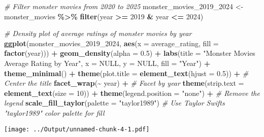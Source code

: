 \documentclass[
]{article}
\newenvironment{Shaded}{\begin{snugshade}}{\end{snugshade}}
\newcommand{\AttributeTok}[1]{\textcolor[rgb]{0.13,0.29,0.53}{#1}}
\newcommand{\CommentTok}[1]{\textcolor[rgb]{0.56,0.35,0.01}{\textit{#1}}}
\newcommand{\ConstantTok}[1]{\textcolor[rgb]{0.56,0.35,0.01}{#1}}
\newcommand{\DecValTok}[1]{\textcolor[rgb]{0.00,0.00,0.81}{#1}}
\newcommand{\FloatTok}[1]{\textcolor[rgb]{0.00,0.00,0.81}{#1}}
\newcommand{\FunctionTok}[1]{\textcolor[rgb]{0.13,0.29,0.53}{\textbf{#1}}}
\newcommand{\NormalTok}[1]{#1}
\newcommand{\OtherTok}[1]{\textcolor[rgb]{0.56,0.35,0.01}{#1}}
\newcommand{\SpecialCharTok}[1]{\textcolor[rgb]{0.81,0.36,0.00}{\textbf{#1}}}
\newcommand{\StringTok}[1]{\textcolor[rgb]{0.31,0.60,0.02}{#1}}
\begin{document}
\begin{Shaded}
\begin{Highlighting}[]
\CommentTok{\# Filter monster movies from 2020 to 2025}
\NormalTok{monster\_movies\_2019\_2024 }\OtherTok{\textless{}{-}}\NormalTok{ monster\_movies }\SpecialCharTok{\%\textgreater{}\%}
  \FunctionTok{filter}\NormalTok{(year }\SpecialCharTok{\textgreater{}=} \DecValTok{2019} \SpecialCharTok{\&}\NormalTok{ year }\SpecialCharTok{\textless{}=} \DecValTok{2024}\NormalTok{)}


\CommentTok{\# Density plot of average ratings of monster movies by year}
\FunctionTok{ggplot}\NormalTok{(monster\_movies\_2019\_2024, }\FunctionTok{aes}\NormalTok{(}\AttributeTok{x =}\NormalTok{ average\_rating, }\AttributeTok{fill =} \FunctionTok{factor}\NormalTok{(year))) }\SpecialCharTok{+}
  \FunctionTok{geom\_density}\NormalTok{(}\AttributeTok{alpha =} \FloatTok{0.5}\NormalTok{) }\SpecialCharTok{+}
  \FunctionTok{labs}\NormalTok{(}\AttributeTok{title =} \StringTok{"Monster Movies Average Rating by Year"}\NormalTok{,}
       \AttributeTok{x =} \ConstantTok{NULL}\NormalTok{,}
       \AttributeTok{y =} \ConstantTok{NULL}\NormalTok{,}
       \AttributeTok{fill =} \StringTok{"Year"}\NormalTok{) }\SpecialCharTok{+}
  \FunctionTok{theme\_minimal}\NormalTok{() }\SpecialCharTok{+}
  \FunctionTok{theme}\NormalTok{(}\AttributeTok{plot.title =} \FunctionTok{element\_text}\NormalTok{(}\AttributeTok{hjust =} \FloatTok{0.5}\NormalTok{)) }\SpecialCharTok{+}  \CommentTok{\# Center the title}
  \FunctionTok{facet\_wrap}\NormalTok{(}\SpecialCharTok{\textasciitilde{}}\NormalTok{ year) }\SpecialCharTok{+}  \CommentTok{\# Facet by year}
  \FunctionTok{theme}\NormalTok{(}\AttributeTok{strip.text =} \FunctionTok{element\_text}\NormalTok{(}\AttributeTok{size =} \DecValTok{10}\NormalTok{)) }\SpecialCharTok{+} 
  \FunctionTok{theme}\NormalTok{(}\AttributeTok{legend.position =} \StringTok{"none"}\NormalTok{) }\SpecialCharTok{+} \CommentTok{\# Remove the legend}
  \FunctionTok{scale\_fill\_taylor}\NormalTok{(}\AttributeTok{palette =} \StringTok{"taylor1989"}\NormalTok{)  }\CommentTok{\# Use Taylor Swift\textquotesingle{}s "taylor1989" color palette for fill}
\end{Highlighting}
\end{Shaded}

\texttt{[image: ../Output/unnamed-chunk-4-1.pdf]}
\end{document}
